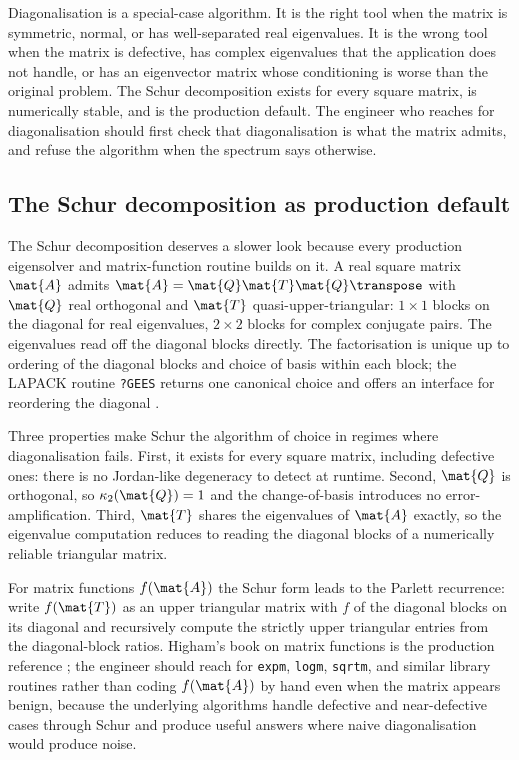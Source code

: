 \begin{principle}
Diagonalisation is a special-case algorithm. It is the right tool
when the matrix is symmetric, normal, or has well-separated real
eigenvalues. It is the wrong tool when the matrix is defective, has
complex eigenvalues that the application does not handle, or has an
eigenvector matrix whose conditioning is worse than the original
problem. The Schur decomposition exists for every square matrix,
is numerically stable, and is the production default. The engineer
who reaches for diagonalisation should first check that
diagonalisation is what the matrix admits, and refuse the
algorithm when the spectrum says otherwise.
\end{principle}

\subsection{The Schur decomposition as production default}

The Schur decomposition deserves a slower look because every
production eigensolver and matrix-function routine builds on it. A
real square matrix $\mat{A}$ admits $\mat{A} = \mat{Q} \mat{T}
\mat{Q}\transpose$ with $\mat{Q}$ real orthogonal and $\mat{T}$
quasi-upper-triangular: $1 \times 1$ blocks on the diagonal for real
eigenvalues, $2 \times 2$ blocks for complex conjugate pairs. The
eigenvalues read off the diagonal blocks directly. The factorisation
is unique up to ordering of the diagonal blocks and choice of basis
within each block; the LAPACK routine \texttt{?GEES} returns one
canonical choice and offers an interface for reordering the diagonal
\cite[ch.~7]{text:v2ch10-golub-vanloan2013}.

Three properties make Schur the algorithm of choice in regimes where
diagonalisation fails. First, it exists for every square matrix,
including defective ones: there is no Jordan-like degeneracy to
detect at runtime. Second, $\mat{Q}$ is orthogonal, so $\kappa_{2}
(\mat{Q}) = 1$ and the change-of-basis introduces no
error-amplification. Third, $\mat{T}$ shares the eigenvalues of
$\mat{A}$ exactly, so the eigenvalue computation reduces to reading
the diagonal blocks of a numerically reliable triangular matrix.

For matrix functions $f(\mat{A})$ the Schur form leads to the
Parlett recurrence: write $f(\mat{T})$ as an upper triangular matrix
with $f$ of the diagonal blocks on its diagonal and recursively
compute the strictly upper triangular entries from the
diagonal-block ratios. Higham's book on matrix functions is the
production reference \cite[ch.~9]{text:v2ch10-higham-functions2008};
the engineer should reach for \texttt{expm}, \texttt{logm},
\texttt{sqrtm}, and similar library routines rather than coding
$f(\mat{A})$ by hand even when the matrix appears benign, because
the underlying algorithms handle defective and near-defective cases
through Schur and produce useful answers where naive diagonalisation
would produce noise.

